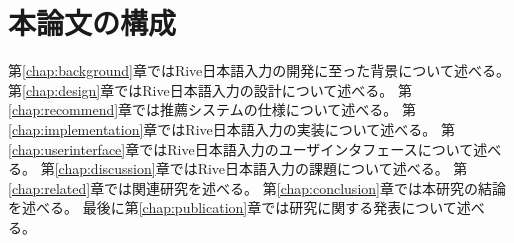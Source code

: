 \section{本論文の構成}
第\ref{chap:background}章ではRive日本語入力の開発に至った背景について述べる。
第\ref{chap:design}章ではRive日本語入力の設計について述べる。
第\ref{chap:recommend}章では推薦システムの仕様について述べる。
第\ref{chap:implementation}章ではRive日本語入力の実装について述べる。
第\ref{chap:userinterface}章ではRive日本語入力のユーザインタフェースについて述べる。
第\ref{chap:discussion}章ではRive日本語入力の課題について述べる。
第\ref{chap:related}章では関連研究を述べる。
第\ref{chap:conclusion}章では本研究の結論を述べる。
最後に第\ref{chap:publication}章では研究に関する発表について述べる。
